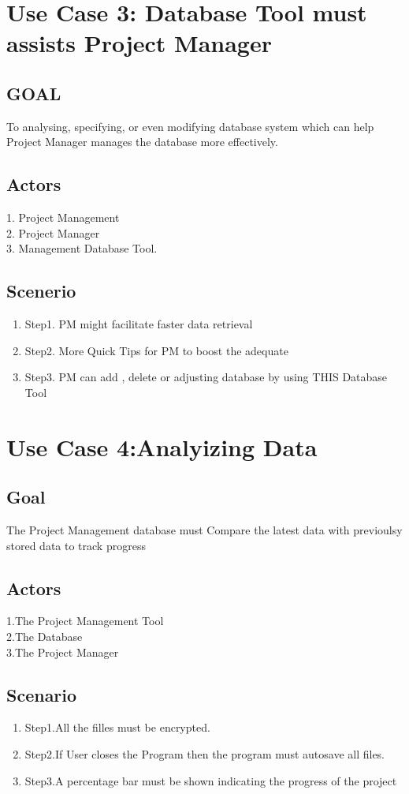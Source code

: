 \documentclass[10pt]{article}
\begin{document}
\section*{Use Case 3: Database Tool must assists Project Manager }
\subsection{GOAL}
To analysing, specifying, or even modifying database system which can help Project Manager manages the database more effectively.
\subsection{Actors}
1. Project Management \\
2. Project Manager \\
3. Management Database Tool. 
\subsection{Scenerio}
\begin{enumerate}
\item Step1. PM might facilitate faster data retrieval 
\item Step2. More Quick Tips for PM to boost the adequate 
\item Step3. PM can add , delete or adjusting database by using THIS Database Tool
\end{enumerate}

\section * {Use Case 4:Analyizing Data}
\subsection * {Goal}
The Project Management database must Compare the latest data with previoulsy stored data to track progress
\subsection * {Actors}
1.The Project Management Tool\\
2.The Database\\
3.The Project Manager

\subsection * {Scenario}
\begin{enumerate}
\item Step1.All the filles must be encrypted.
\item Step2.If User closes the Program then the program must autosave all files.
\item Step3.A percentage bar must be shown indicating the progress of the project
\end{enumerate}
\end{document}
